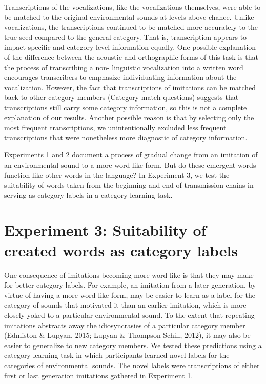 \documentclass[english,floatsintext,man]{apa6}
\theoremstyle{definition}
\theoremstyle{definition}
\theoremstyle{definition}
\theoremstyle{remark}
\begin{document}
Transcriptions of the vocalizations, like the vocalizations themselves,
were able to be matched to the original environmental sounds at levels
above chance. Unlike vocalizations, the transcriptions continued to be
matched more accurately to the true seed compared to the general
category. That is, transcription appears to impact specific and
category-level information equally. One possible explanation of the
difference between the acoustic and orthographic forms of this task is
that the process of transcribing a non- linguistic vocalization into a
written word encourages transcribers to emphasize individuating
information about the vocalization. However, the fact that
transcriptions of imitations can be matched back to other category
members (Category match questions) suggests that transcriptions still
carry some category information, so this is not a complete explanation
of our results. Another possible reason is that by selecting only the
most frequent transcriptions, we unintentionally excluded less frequent
transcriptions that were nonetheless more diagnostic of category
information.

Experiments 1 and 2 document a process of gradual change from an
imitation of an environmental sound to a more word-like form. But do
these emergent words function like other words in the language? In
Experiment 3, we test the suitability of words taken from the beginning
and end of transmission chains in serving as category labels in a
category learning task.

\hypertarget{experiment-3-suitability-of-created-words-as-category-labels}{%
\section{Experiment 3: Suitability of created words as category
labels}\label{experiment-3-suitability-of-created-words-as-category-labels}}

One consequence of imitations becoming more word-like is that they may
make for better category labels. For example, an imitation from a later
generation, by virtue of having a more word-like form, may be easier to
learn as a label for the category of sounds that motivated it than an
earlier imitation, which is more closely yoked to a particular
environmental sound. To the extent that repeating imitations abstracts
away the idiosyncrasies of a particular category member (Edmiston \&
Lupyan, 2015; Lupyan \& Thompson-Schill, 2012), it may also be easier to
generalize to new category members. We tested these predictions using a
category learning task in which participants learned novel labels for
the categories of environmental sounds. The novel labels were
transcriptions of either first or last generation imitations gathered in
Experiment 1.
\end{document}
